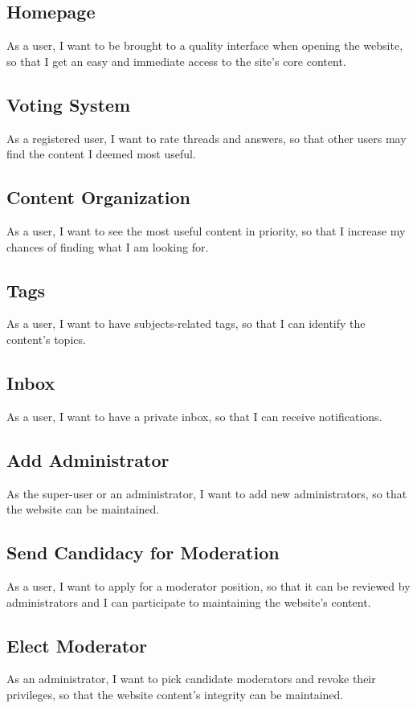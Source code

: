 \documentclass [a4paper, 11pt]{article}
\begin{document}
\subsection{Homepage}
As a user, I want to be brought to a quality interface when opening the website, so that I get an easy and immediate access to the site's core content.

\subsection{Voting System}
As a registered user, I want to rate threads and answers, so that other users may find the content I deemed most useful.

\subsection{Content Organization}
As a user, I want to see the most useful content in priority, so that I increase my chances of finding what I am looking for.

\subsection{Tags}
As a user, I want to have subjects-related tags, so that I can identify the content's topics.

\subsection{Inbox}
As a user, I want to have a private inbox, so that I can receive notifications.

\subsection{Add Administrator}
As the super-user or an administrator, I want to add new administrators, so that the website can be maintained.

\subsection{Send Candidacy for Moderation}
As a user, I want to apply for a moderator position, so that it can be reviewed by administrators and I can participate to maintaining the website's content.

\subsection{Elect Moderator}
As an administrator, I want to pick candidate moderators and revoke their privileges, so that the website content's integrity can be maintained.
\end{document}
